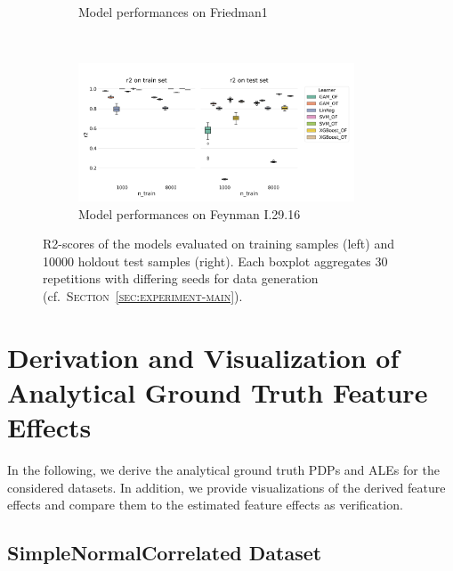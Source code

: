 \documentclass[runningheads]{llncs}
\begin{document}
\begin{figure}[h!]
\begin{subfigure}[b]{\textwidth}
        \caption{Model performances on Friedman1}
    \end{subfigure}
    \\[10pt]
    \vfill
    \begin{subfigure}[b]{\textwidth}
        \centering
        \includegraphics[width=0.9\textwidth]{img/model_performance_FeynmanI.29.16.png}
        \caption{Model performances on Feynman I.29.16}
    \end{subfigure}
    \caption{R2-scores of the models evaluated on training samples (left) and 10000 holdout test samples (right).
    Each boxplot aggregates 30 repetitions with differing seeds for data generation (cf.\ \textsc{Section~\ref{sec:experiment-main}}).}
    \label{fig:model-performance}  %
\end{figure}

\clearpage
\section{Derivation and Visualization of Analytical Ground Truth Feature Effects}\label{app:ground-truth-feature-effects}
In the following, we derive the analytical ground truth PDPs and ALEs for the
considered datasets. In addition, we provide visualizations of the derived
feature effects and compare them to the estimated feature effects as verification.

\subsection{SimpleNormalCorrelated Dataset}
\end{document}
